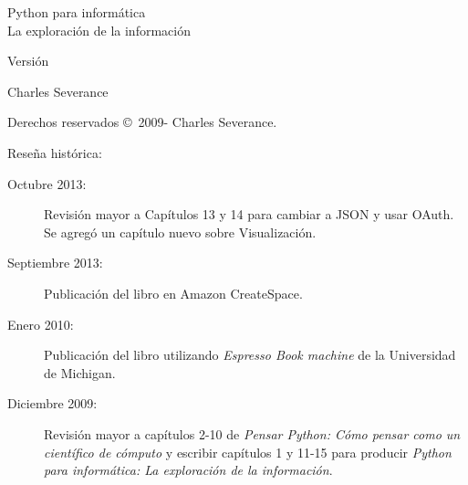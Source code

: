 



\newtheorem{ex}{Exercise}[chapter]

\begin{latexonly}

\renewcommand{\blankpage}{\thispagestyle{empty} \quad \newpage}

\thispagestyle{empty}

\begin{flushright}
\vspace*{2.0in}

\begin{spacing}{3}
{\huge Python para inform\'atica}\\
{\Large La exploraci\'on de la informaci\'on}
\end{spacing}

\vspace{0.25in}

Versi\'on \theversion

\vspace{0.5in}


{\Large
Charles Severance\\
}

\vfill

\end{flushright}

\pagebreak
\thispagestyle{empty}

{\small
Derechos reservados \copyright ~2009- Charles Severance.


Rese\~na hist\'orica:

\begin{description}

\item[Octubre 2013:] Revisi\'on mayor a Cap\'itulos 13 y 14
para cambiar a JSON y usar OAuth.
Se agreg\'o un cap\'itulo nuevo sobre Visualizaci\'on.

\item[Septiembre 2013:] Publicaci\'on del libro en Amazon CreateSpace.

\item[Enero 2010:] Publicaci\'on del libro utilizando \textit{Espresso Book machine} de la Universidad de Michigan.

\item[Diciembre 2009:] Revisi\'on mayor a cap\'itulos 2-10 de
\emph{Pensar Python: C\'omo pensar como un cient\'ifico de c\'omputo}
y escribir cap\'itulos 1 y 11-15 para producir 
\emph{Python para inform\'atica: La exploraci\'on de la informaci\'on}.


\end{description}}
\end{latexonly}
